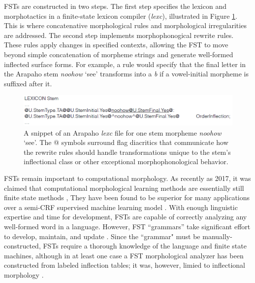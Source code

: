 \documentclass[12pt]{article}
\begin{document}
FSTs are constructed in two steps. The first step specifies the lexicon and morphotactics in a finite-state lexicon compiler ({\it lexc}), illustrated in Figure \ref{fig:lexc}. This is where concatenative morphological rules and morphological irregularities are addressed. The second step implements morphophonogical rewrite rules. These rules apply changes in specified contexts, allowing the FST to move beyond simple concatenation of morpheme strings and generate well-formed inflected surface forms. For example, a rule would specify that the final letter in the Arapaho stem \textit{noohow} `see' transforms into a \textit{b} if a vowel-initial morpheme is suffixed after it.
\bigskip
\begin{figure}[ht]
\label{fig:lexc}
\begin{center}
\includegraphics[width=0.95\columnwidth]{FSTlexicon.PNG}
\caption{A snippet of an Arapaho \textit{lexc} file for one stem morpheme \textit{noohow} `see'. The @ symbols surround flag diacritics that communicate how the rewrite rules should handle transformations unique to the stem's inflectional class or other exceptional morphophonological behavior.}
\end{center}
\end{figure}

FSTs remain important to computational morphology. As recently as 2017, it was claimed that computational morphological learning methods are essentially still finite state methods \cite{goldsmith_computational_2017}, They have been found to be superior for many applications over a semi-CRF supervised machine learning model \cite{cotterell_labeled_2015}. With enough linguistic expertise and time for development, FSTs are capable of correctly analyzing any well-formed word in a language. However, FST “grammars” take significant effort to develop, maintain, and update \cite{durrett_supervised_2013,moeller_neural_2018}. Since the ``grammar" must be manually-constructed, FSTs require a thorough knowledge of the language and finite state machines, although in at least one case a FST morphological analyzer has been constructed from labeled inflection tables; it was, however, limied to inflectional morphology \cite{forsberg_learning_2016}.
\end{document}
